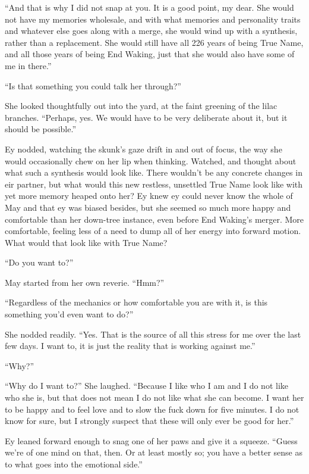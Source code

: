 ``And that is why I did not snap at you. It is a good point, my dear. She would not have my memories wholesale, and with what memories and personality traits and whatever else goes along with a merge, she would wind up with a synthesis, rather than a replacement. She would still have all 226 years of being True Name, and all those years of being End Waking, just that she would also have some of me in there.''

``Is that something you could talk her through?''

She looked thoughtfully out into the yard, at the faint greening of the lilac branches. ``Perhaps, yes. We would have to be very deliberate about it, but it should be possible.''

Ey nodded, watching the skunk's gaze drift in and out of focus, the way she would occasionally chew on her lip when thinking. Watched, and thought about what such a synthesis would look like. There wouldn't be any concrete changes in eir partner, but what would this new restless, unsettled True Name look like with yet more memory heaped onto her? Ey knew ey could never know the whole of May and that ey was biased besides, but she seemed so much more happy and comfortable than her down-tree instance, even before End Waking's merger. More comfortable, feeling less of a need to dump all of her energy into forward motion. What would that look like with True Name?

``Do you want to?''

May started from her own reverie. ``Hmm?''

``Regardless of the mechanics or how comfortable you are with it, is this something you'd even want to do?''

She nodded readily. ``Yes. That is the source of all this stress for me over the last few days. I want to, it is just the reality that is working against me.''

``Why?''

``Why do I want to?'' She laughed. ``Because I like who I am and I do not like who she is, but that does not mean I do not like what she can become. I want her to be happy and to feel love and to slow the fuck down for five minutes. I do not know for sure, but I strongly suspect that these will only ever be good for her.''

Ey leaned forward enough to snag one of her paws and give it a squeeze. ``Guess we're of one mind on that, then. Or at least mostly so; you have a better sense as to what goes into the emotional side.''

